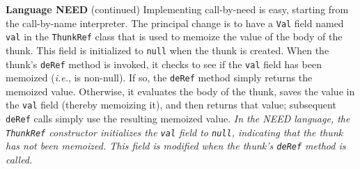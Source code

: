 \begin{minipage}[t]{\sw}
\slidenumber
\LARGE
{\bf Language NEED} (continued)\exx
Implementing call-by-need is easy, starting
from the call-by-name interpreter.
The principal change is to have a \verb'Val' field named \verb'val'
in the \verb'ThunkRef' class
that is used to memoize the value of the body of the thunk.
This field is initialized to \verb'null' when the thunk is created.
When the thunk's \verb'deRef' method is invoked,
it checks to see if the \verb'val' field has been memoized
({\em i.e.}, is non-null).
If so, the \verb'deRef' method simply returns the memoized value.
Otherwise, it evaluates the body of the thunk,
saves the value in the \verb'val' field (thereby memoizing it),
and then returns that value;
subsequent \verb'deRef' calls simply use the resulting memoized value.\exx
{\em In the NEED language,
the \verb'ThunkRef' constructor initializes
the \verb'val' field to \verb'null',
indicating that the thunk has not been memoized.
This field is modified when the thunk's \verb'deRef' method is called.}
\end{minipage}
\clearpage
